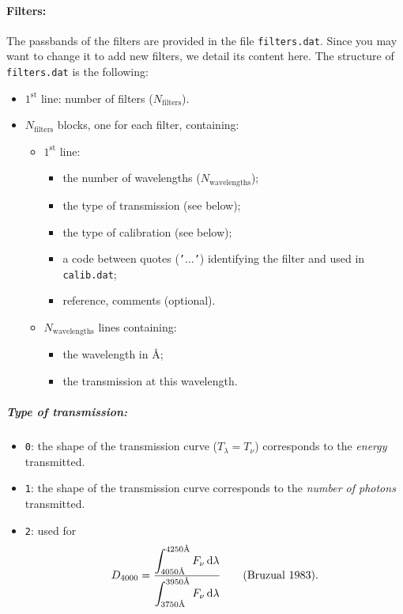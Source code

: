 \documentclass[11pt,draft,fleqn]{article}
\newcommand{\ang}{\textrm{\scriptsize \AA}}
\begin{document}
\paragraph{Filters:}
The passbands of the filters are provided in the file \texttt{filters.dat}.
Since you may want to change it to add new filters, we detail its
content here.
The structure of \texttt{filters.dat} is the following:
\begin{itemize}
\item
$1^{\mathrm{st}}$ line: number of filters ($N_{\mathrm{filters}}$). 
\item
$N_{\mathrm{filters}}$ blocks, one for each filter, containing:
\begin{itemize}
\item $1^{\mathrm{st}}$ line:
\begin{itemize}
\item the number of wavelengths ($N_{\mathrm{wavelengths}}$);
\item the type of transmission (see below);
\item the type of calibration (see below);
\item a code between quotes (\texttt{'}...\texttt{'}) identifying the filter and used in 
\texttt{calib.dat};
\item reference, comments (optional).
\end{itemize}
\item $N_{\mathrm{wavelengths}}$ lines containing:
\begin{itemize}
\item the wavelength in \AA;
\item the transmission at this wavelength.
\end{itemize}
\end{itemize}
\end{itemize}
\subparagraph{\textit{Type of transmission:}}
\begin{itemize}
\item \texttt{0}: the shape of the transmission curve ($T_{\lambda}=T_{\nu}$) corresponds to 
the \emph{energy} transmitted.
\item \texttt{1}: the shape of the transmission curve corresponds to 
the \emph{number of photons} transmitted.
\item \texttt{2}: used for
\[D_{4000}=\frac{\displaystyle{\int_{4050\ang}^{4250\ang}F_{\nu}\,\mathrm{d}\lambda}}
{\displaystyle{\int_{3750\ang}^{3950\ang}F_{\nu}\,\mathrm{d}\lambda}}
\qquad\textrm{(Bruzual 1983).}\]
\end{itemize}
\end{document}
